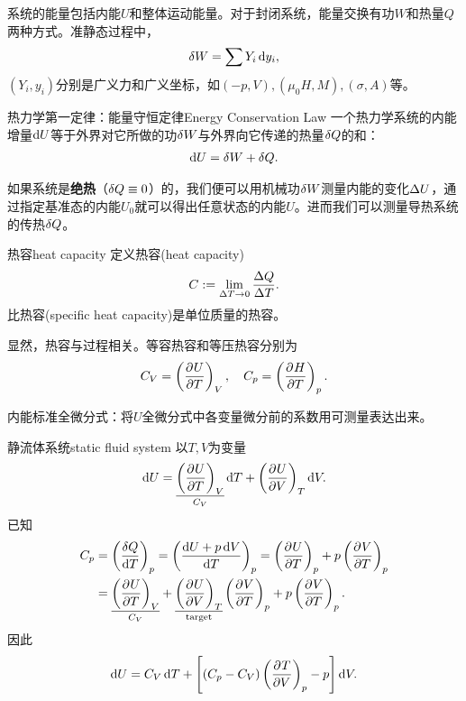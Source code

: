 系统的能量包括内能$U$和整体运动能量。对于封闭系统，能量交换有功$W$和热量$Q$两种方式。准静态过程中，
\begin{align}
	\vd W=\sum Y_i\d y_i,
\end{align}
$(Y_i,y_i)$分别是广义力和广义坐标，如$(-p,V),(\mu_0H,M),(\sigma,A)$等。
\begin{theorem}{热力学第一定律：能量守恒定律}{Energy Conservation Law}
	一个热力学系统的内能增量$\d U$等于外界对它所做的功$\vd W$与外界向它传递的热量$\vd Q$的和：
	\begin{align}
		\d U=\vd W+\vd Q.
	\end{align}
\end{theorem}
\indent 如果系统是\textbf{绝热}（$\vd Q\equiv 0$）的，我们便可以用机械功$\vd W$测量内能的变化$\D U$，通过指定基准态的内能$U_0$就可以得出任意状态的内能$U$。进而我们可以测量导热系统的传热$\vd Q$。
\begin{definition}{热容}{heat capacity}
	定义热容(heat capacity)
	\begin{equation}
		C:=\lim_{\D T\to0}\frac{\D Q}{\D T}.
	\end{equation}
	比热容(specific heat capacity)是单位质量的热容。
\end{definition}
显然，热容与过程相关。等容热容和等压热容分别为
\begin{align}
	C_V=\kh{\pv UT}_V,\quad C_p=\kh{\pv HT}_p.
\end{align}

内能标准全微分式：将$U$全微分式中各变量微分前的系数用可测量表达出来。
\begin{example}{静流体系统}{static fluid system}
	以$T,V$为变量
	\[
		\d U=\underset{C_V}{\underline{\kh{\pv UT}_V}}\d T+\kh{\pv UV}_T\d V.
	\]
	已知 
	\begin{align*}
		C_p&=\kh{\frac{\vd Q}{\d T}}_p=\kh{\frac{\d U+p\d V}{\d T}}_p=\kh{\pv UT}_p+p\kh{\pv VT}_p\\
		&=\underset{C_V}{\underline{\kh{\pv UT}_V}}+\underset{\text{target}}{\underline{\kh{\pv UV}_T}}\kh{\pv VT}_p+p\kh{\pv VT}_p.
	\end{align*}
	因此
	\begin{align}
		\d U=C_V\d T+\fkh{(C_p-C_V)\kh{\pv TV}_p-p}\d V.
	\end{align}
\end{example}
